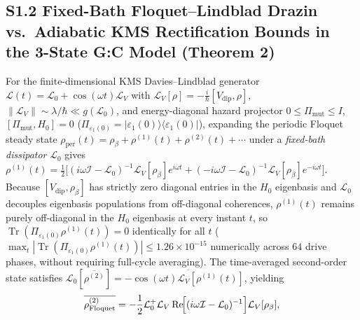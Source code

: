 \documentclass[10pt,letterpaper]{article}
\newcommand{\Lcal}{\mathcal{L}}
\newcommand{\Tr}{\operatorname{Tr}}
\begin{document}
\subsection*{S1.2 Fixed-Bath Floquet--Lindblad Drazin vs.\ Adiabatic KMS Rectification Bounds in the 3-State G:C Model (Theorem 2)}
For the finite-dimensional KMS Davies--Lindblad generator $\Lcal(t) = \Lcal_0 + \cos(\omega t)\Lcal_V$ with $\Lcal_V[\rho] = -\frac{i}{\hbar}[V_{\mathrm{dip}}, \rho]$, $\|\Lcal_V\| \sim \lambda/\hbar \ll g(\Lcal_0)$, and energy-diagonal hazard projector $0 \le \Pi_{\mathrm{mut}} \le I$, $[\Pi_{\mathrm{mut}}, H_0] = 0$ ($\Pi_{\varepsilon_1(0)} = |\varepsilon_1(0)\rangle\langle\varepsilon_1(0)|$), expanding the periodic Floquet steady state $\rho_{\mathrm{per}}(t) = \rho_\beta + \rho^{(1)}(t) + \rho^{(2)}(t) + \cdots$ under a \emph{fixed-bath dissipator} $\Lcal_0$ gives $\rho^{(1)}(t) = \frac{1}{2}\bigl[(i\omega\mathcal{I} - \Lcal_0)^{-1}\Lcal_V[\rho_\beta]e^{i\omega t} + (-i\omega\mathcal{I} - \Lcal_0)^{-1}\Lcal_V[\rho_\beta]e^{-i\omega t}\bigr]$. Because $[V_{\mathrm{dip}}, \rho_\beta]$ has strictly zero diagonal entries in the $H_0$ eigenbasis and $\Lcal_0$ decouples eigenbasis populations from off-diagonal coherences, $\rho^{(1)}(t)$ remains purely off-diagonal in the $H_0$ eigenbasis at every instant $t$, so $\Tr(\Pi_{\varepsilon_1(0)}\rho^{(1)}(t)) = 0$ identically for all $t$ ($\max_t |\Tr(\Pi_{\varepsilon_1(0)}\rho^{(1)}(t))| \le 1.26 \times 10^{-15}$ numerically across $64$ drive phases, without requiring full-cycle averaging). The time-averaged second-order state satisfies $\Lcal_0[\overline{\rho^{(2)}}] = -\overline{\cos(\omega t)\Lcal_V[\rho^{(1)}(t)]}$, yielding
\begin{equation}
    \overline{\rho^{(2)}_{\mathrm{Floquet}}} = -\frac{1}{2}\Lcal_0^+\Lcal_V\,\mathrm{Re}\!\Bigl[(i\omega\mathcal{I} - \Lcal_0)^{-1}\Bigr]\Lcal_V[\rho_\beta],
\end{equation}
\end{document}

